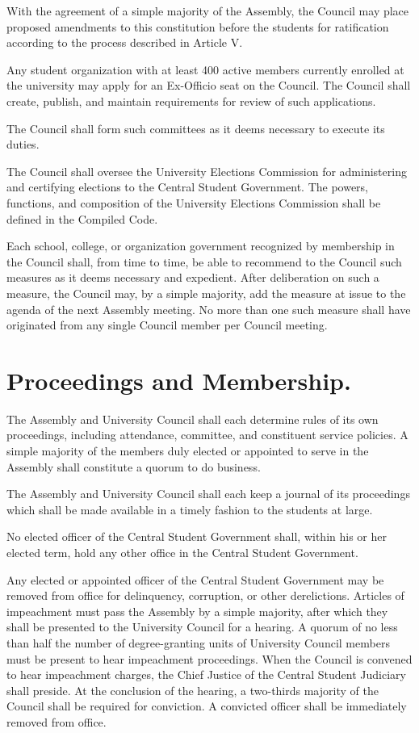     With the agreement of a simple majority of the Assembly, the Council may place proposed amendments to this constitution before the students for ratification according to the process described in Article V.

    Any student organization with at least 400 active members currently enrolled at the university may apply for an Ex-Officio seat on the Council. The Council shall create, publish, and maintain requirements for review of such applications.

    The Council shall form such committees as it deems necessary to execute its duties.

    The Council shall oversee the University Elections Commission for administering and certifying elections to the Central Student Government. The powers, functions, and composition of the University Elections Commission shall be defined in the Compiled Code.

    Each school, college, or organization government recognized by membership in the Council shall, from time to time, be able to recommend to the Council such measures as it deems necessary and expedient. After deliberation on such a measure, the Council may, by a simple majority, add the measure at issue to the agenda of the next Assembly meeting. No more than one such measure shall have originated from any single Council member per Council meeting.


\section{Proceedings and Membership.}
    The Assembly and University Council shall each determine rules of its own proceedings, including attendance, committee, and constituent service policies.  A simple majority of the members duly elected or appointed to serve in the Assembly shall constitute a quorum to do business.

    The Assembly and University Council shall each keep a journal of its proceedings which shall be made available in a timely fashion to the students at large.

    No elected officer of the Central Student Government shall, within his or her elected term, hold any other office in the Central Student Government.

    Any elected or appointed officer of the Central Student Government may be removed from office for delinquency, corruption, or other derelictions. Articles of impeachment must pass the Assembly by a simple majority, after which they shall be presented to the University Council for a hearing. A quorum of no less than half the number of degree-granting units of University Council members must be present to hear impeachment proceedings. When the Council is convened to hear impeachment charges, the Chief Justice of the Central Student Judiciary shall preside. At the conclusion of the hearing, a two-thirds majority of the Council shall be required for conviction. A convicted officer shall be immediately removed from office.

